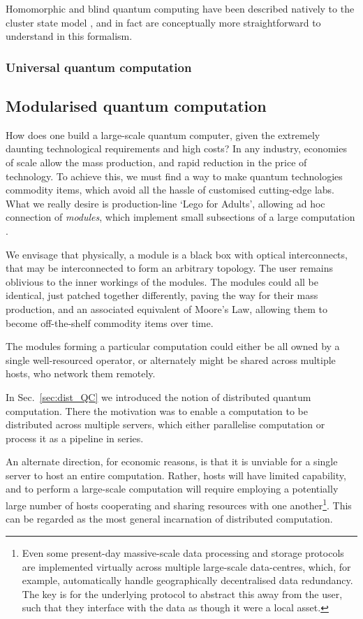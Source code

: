 \documentclass[aps,rmp,twocolumn,amsmath,amssymb,nofootinbib,superscriptaddress,longbibliography,floatfix]{revtex4-1}
\newcommand{\comment}[1]{{\color{blue}{\textbf{#1}}}}
\begin{document}
Homomorphic and blind quantum computing have been described natively to the cluster state model \cite{homoCS}, and in fact are conceptually more straightforward to understand in this formalism. 

%
%

\subsubsection{Universal quantum computation}

\comment{To do}

%
%

\subsection{Modularised quantum computation} \label{sec:module}

How does one build a large-scale quantum computer, given the extremely daunting technological requirements and high costs? In any industry, economies of scale allow the mass production, and rapid reduction in the price of technology. To achieve this, we must find a way to make quantum technologies commodity items, which avoid all the hassle of customised cutting-edge labs. What we really desire is production-line `Lego for Adults', allowing ad hoc connection of \emph{modules}, which implement small subsections of a large computation \cite{bib:FowlerPrivate}.

We envisage that physically, a module is a black box with optical interconnects, that may be interconnected to form an arbitrary topology. The user remains oblivious to the inner workings of the modules. The modules could all be identical, just patched together differently, paving the way for their mass production, and an associated equivalent of Moore's Law, allowing them to become off-the-shelf commodity items over time.

The modules forming a particular computation could either be all owned by a single well-resourced operator, or alternately might be shared across multiple hosts, who network them remotely.

In Sec.~\ref{sec:dist_QC} we introduced the notion of distributed quantum computation. There the motivation was to enable a computation to be distributed across multiple servers, which either parallelise computation or process it as a pipeline in series.

An alternate direction, for economic reasons, is that it is unviable for a single server to host an entire computation. Rather, hosts will have limited capability, and to perform a large-scale computation will require employing a potentially large number of hosts cooperating and sharing resources with one another\footnote{Even some present-day massive-scale data processing and storage protocols are implemented virtually across multiple large-scale data-centres, which, for example, automatically handle geographically decentralised data redundancy. The key is for the underlying protocol to abstract this away from the user, such that they interface with the data as though it were a local asset.}. This can be regarded as the most general incarnation of distributed computation.
\end{document}

